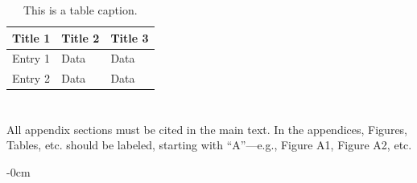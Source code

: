 \documentclass[vision,article,submit,pdftex,moreauthors]{Definitions/mdpi}
\begin{document}
\begin{table}[H] 
\caption{This is a table caption.\label{tab5}}
\begin{tabularx}{\textwidth}{CCC}
\toprule
\textbf{Title 1}	& \textbf{Title 2}	& \textbf{Title 3}\\
\midrule
Entry 1		& Data			& Data\\
Entry 2		& Data			& Data\\
\bottomrule
\end{tabularx}
\end{table}

\section[\appendixname~\thesection]{}
All appendix sections must be cited in the main text. In the appendices, Figures, Tables, etc. should be labeled, starting with ``A''---e.g., Figure A1, Figure A2, etc.

\begin{adjustwidth}{-\extralength}{0cm}




\end{adjustwidth}
\end{document}
